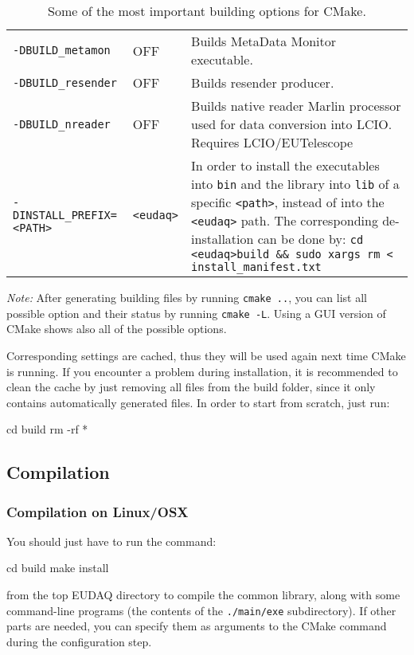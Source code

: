 \begin{table}[!h]
{\begin{tabular}{l|l|p{9.5cm}}
\texttt{-DBUILD\_metamon} &  OFF &  Builds MetaData Monitor executable. \\
\texttt{-DBUILD\_resender} & OFF &  Builds resender producer. \\
\texttt{-DBUILD\_nreader} &  OFF &  Builds native reader Marlin processor used for data conversion into LCIO. Requires LCIO/EUTelescope \\
\texttt{-DINSTALL\_PREFIX=<PATH>} & \texttt{<eudaq>} & In order to install the executables into \texttt{bin} and the library into \texttt{lib} of a specific \texttt{<path>}, instead of into the \texttt{<eudaq>} path. 
The corresponding de-installation can be done by:
\texttt{cd <eudaq>\/build\/ \&\& sudo xargs rm < install\_manifest.txt}
\end{tabular}
\caption{Some of the most important building options for CMake.}
\label{tab:cmakeoptions}
}
\end{table}

\textit{Note:} After generating building files by running \texttt{cmake ..}, you can list all possible option and their status by running \texttt{cmake -L}. 
Using a GUI version of CMake shows also all of the possible options.   

Corresponding settings are cached, thus they will be used again next time CMake is running.
If you encounter a problem during installation, it is recommended to clean the cache by just removing all files from the build folder, since it only contains automatically generated files. 
In order to start from scratch, just run:
\begin{listing}[mybash]
cd build
rm -rf *
\end{listing}


\subsection{Compilation}

\subsubsection{Compilation on Linux/OSX}
You should just have to run the command:
\begin{listing}[mybash]
cd build
make install
\end{listing}

from the top EUDAQ directory to compile the common library,
along with some command-line programs (the contents of the \texttt{./main/exe} subdirectory).
If other parts are needed, you can specify them as arguments to the
CMake command during the configuration step.

